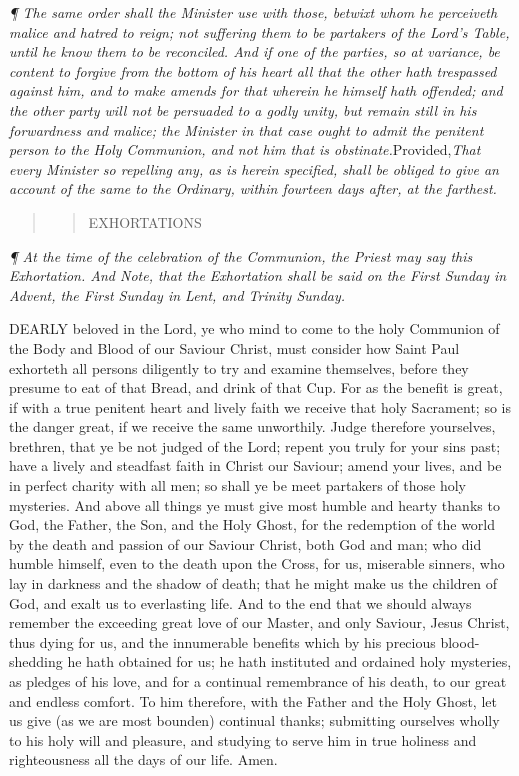 \emph{¶
The same order shall the Minister use with those, betwixt whom he perceiveth
malice and hatred to reign; not suffering them to be partakers of the
Lord’s Table, until he know them to be reconciled. And if one of
the parties, so at variance, be content to forgive from the bottom of
his heart all that the other hath trespassed against him, and to make
amends for that wherein he himself hath offended; and the other party
will not be persuaded to a godly unity, but remain still in his forwardness
and malice; the Minister in that case ought to admit the penitent person
to the Holy Communion, and not him that is obstinate.}Provided,\emph{That every Minister so repelling any, as is herein specified, shall be
obliged to give an account of the same to the Ordinary, within fourteen
days after, at the farthest.}

\begin{quote}

\begin{quote}

EXHORTATIONS

\end{quote}

\end{quote}

\emph{¶
At the time of the celebration of the Communion, the Priest may say this
Exhortation. And Note, that the Exhortation shall be said on the First
Sunday in Advent, the First Sunday in Lent, and Trinity Sunday.}

DEARLY
beloved in the Lord, ye who mind to come to the holy Communion of the
Body and Blood of our Saviour Christ, must consider how Saint Paul exhorteth
all persons diligently to try and examine themselves, before they presume
to eat of that Bread, and drink of that Cup. For as the benefit is great,
if with a true penitent heart and lively faith we receive that holy Sacrament;
so is the danger great, if we receive the same unworthily. Judge therefore
yourselves, brethren, that ye be not judged of the Lord; repent you truly
for your sins past; have a lively and steadfast faith in Christ our Saviour;
amend your lives, and be in perfect charity with all men; so shall ye
be meet partakers of those holy mysteries. And above all things ye must
give most humble and hearty thanks to God, the Father, the Son, and the
Holy Ghost, for the redemption of the world by the death and passion of
our Saviour Christ, both God and man; who did humble himself, even to
the death upon the Cross, for us, miserable sinners, who lay in darkness
and the shadow of death; that he might make us the children of God, and
exalt us to everlasting life. And to the end that we should always remember
the exceeding great love of our Master, and only Saviour, Jesus Christ,
thus dying for us, and the innumerable benefits which by his precious
blood-shedding he hath obtained for us; he hath instituted and ordained
holy mysteries, as pledges of his love, and for a continual remembrance
of his death, to our great and endless comfort. To him therefore, with
the Father and the Holy Ghost, let us give (as we are most bounden) continual
thanks; submitting ourselves wholly to his holy will and pleasure, and
studying to serve him in true holiness and righteousness all the days
of our life. Amen.

